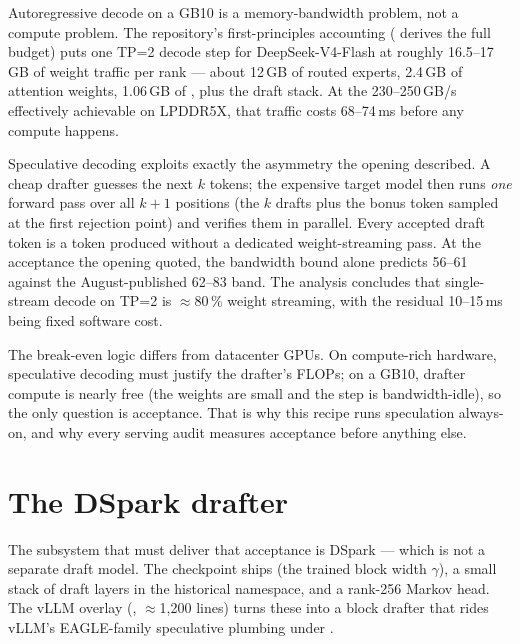 Autoregressive decode on a GB10 is a memory-bandwidth problem, not a compute
problem. The repository's first-principles accounting
( derives the full budget) puts one
TP=2 decode step for DeepSeek-V4-Flash at roughly 16.5--17\,GB of weight
traffic per rank --- about 12\,GB of routed experts, 2.4\,GB of attention
weights, 1.06\,GB of , plus the draft stack. At the
230--250\,GB/s effectively achievable on LPDDR5X, that traffic costs
68--74\,ms before any compute happens.

Speculative decoding exploits exactly the asymmetry the opening described. A
cheap drafter guesses the next $k$ tokens; the expensive target model then
runs \emph{one} forward pass over all $k{+}1$ positions (the $k$ drafts plus
the bonus token sampled at the first rejection point) and verifies them in
parallel. Every accepted draft token is a token produced without a dedicated
weight-streaming pass. At the acceptance the opening quoted, the bandwidth
bound alone predicts 56--61 \tokspersec{} against the August-published
62--83 band.
The analysis concludes that single-stream decode on TP=2 is
$\approx$80\,\% weight streaming, with the residual 10--15\,ms being fixed
software cost.

\begin{hbnote}
The break-even logic differs from datacenter GPUs. On compute-rich hardware,
speculative decoding must justify the drafter's FLOPs; on a GB10, drafter
compute is nearly free (the weights are small and the step is
bandwidth-idle), so the only question is acceptance. That is why this recipe
runs speculation always-on, and why every serving audit measures acceptance
before anything else.
\end{hbnote}

\section{The DSpark drafter}
\label{sec:specdecode-design}

The subsystem that must deliver that acceptance is DSpark --- which is not a
separate draft model. The checkpoint ships
 (the trained block width $\gamma$), a small stack of
draft layers in the historical  namespace, and a rank-256 Markov
head. The vLLM overlay (,
$\approx$1{,}200 lines) turns these into a block drafter that rides vLLM's
EAGLE-family speculative plumbing under .

